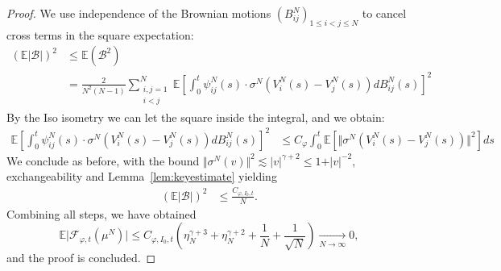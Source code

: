 \documentclass[11pt,a4paper]{article}
\theoremstyle{definition}
\theoremstyle{plain}
\begin{document}
\begin{proof}
    We use independence of the Brownian motions $(B^N_{ij})_{1\leq i<j \leq N}$ to cancel cross terms in the square expectation:
    \begin{align*}
        (\mathbb{E}\vert \mathcal{B}\vert)^2 &\leq\mathbb{E} (\mathcal{B}^2)\\
        &= \frac{2}{N^2(N-1)} \sum_{\substack{i,j=1\\ i< j}}^N \mathbb{E}\left[\int_0^t  \psi^N_{ij}(s)\cdot \sigma^N \left(V^N_i(s) - V^N_j(s)\right)dB^N_{ij}(s) \right]^2
    \end{align*}
    By the Iso isometry we can let the square inside the integral, and we obtain:
    \begin{align*}
        \mathbb{E}\left[\int_0^t  \psi^N_{ij}(s)\cdot \sigma^N \left(V^N_i(s) - V^N_j(s)\right)dB^N_{ij}(s) \right]^2 &\leq C_\varphi \int_0^t\mathbb{E}\left[ \Vert\sigma^N \left(V^N_i(s) - V^N_j(s)\right)\Vert^2 \right]ds
    \end{align*}
    We conclude as before, with the bound $\Vert\sigma^N \left(v\right)\Vert^2 \lesssim \vert v \vert^{\gamma+2} \leq 1 + \vert v \vert^{-2}$, exchangeability and Lemma~\ref{lem:keyestimate} yielding
    \begin{align*}
        (\mathbb{E}\vert \mathcal{B}\vert)^2 &\leq \frac{C_{\varphi,I_0,t}}{N}.
    \end{align*}
    Combining all steps, we have obtained
    $$\mathbb{E}\vert \mathcal{F}_{\varphi,t}(\mu^N)\vert \leq C_{\varphi,I_0,t}\left(\eta_N^{\gamma+3} + \eta_N^{\gamma+2} + \frac{1}{N}+\frac{1}{\sqrt{N}}\right)\xrightarrow[N\rightarrow\infty]{} 0,$$
    and the proof is concluded.
\end{proof}
\end{document}
